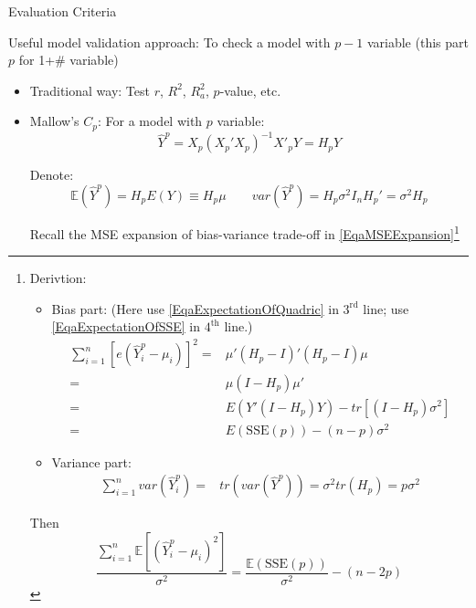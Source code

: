 \begin{point}
    \hypertarget{ModelValidationCriteria}{Evaluation Criteria}
\end{point}

     Useful model validation approach: To check a model with $ p-1 $ variable (this part $ p $ for 1+\# variable)
        \begin{itemize}[topsep=2pt,itemsep=2pt]
        \item Traditional way: Test $ r $, $ R^2 $, $ R_a^2 $, $ p $-value, etc.
        \item Mallow's $ C_p $: For a model with $ p $ variable: 
        \begin{equation}
            \hat{Y}^p=X_p(X_p'X_p)^{-1}X'_pY=H_pY 
        \end{equation}
        
        Denote:
        \begin{equation}
            \mathbb{E}(\hat{Y}^p)=H_pE(Y)\equiv H_p\mu \qquad var(\hat{Y}^p)=H_p\sigma ^2I_nH_p'=\sigma ^2H_p
        \end{equation}

        Recall the MSE expansion of bias-variance trade-off in \autoref{EqaMSEExpansion}\footnote{Derivtion:
        \begin{itemize}[topsep=2pt,itemsep=0pt]
            \item Bias part: (Here use \autoref{EqaExpectationOfQuadric} in $ 3^\mathrm{rd} $ line; use \autoref{EqaExpectationOfSSE} in $ 4^\mathrm{th} $ line.)
            \begin{align*}
                \sum_{i=1}^n[e(\hat{Y}_i^p-\mu _i)]^2=&\mu'(H_p-I)'(H_p-I)\mu\\
                =&\mu (I-H_p)\mu '\\
                =&E(Y'(I-H_p)Y)-tr[(I-H_p)\sigma ^2]\\
                =&E(\mathrm{SSE}(p))-(n-p)\sigma ^2
            \end{align*}
            \item Variance part:
            \begin{align*}
                \sum_{i=1}^nvar(\hat{Y}_i^p)=& tr(var(\hat{Y}^p))=\sigma ^2tr(H_p)=p\sigma ^2
            \end{align*}
        \end{itemize}

        Then
        \begin{equation}
             \dfrac{\sum_{i=1}^n \mathbb{E}[(\hat{Y}_i^p-\mu_i)^2]}{\sigma ^2}=\dfrac{\mathbb{E}(\mathrm{SSE}(p) )}{\sigma ^2}-(n-2p)
        \end{equation}
            }


\end{itemize}
